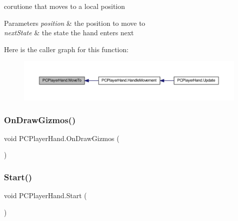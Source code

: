 corutione that moves to a local position 


\begin{DoxyParams}{Parameters}
{\em position} & the position to move to\\
\hline
{\em next\+State} & the state the hand enters next\\
\hline
\end{DoxyParams}
Here is the caller graph for this function\+:\nopagebreak
\begin{figure}[H]
\begin{center}
\leavevmode
\includegraphics[width=350pt]{class_p_c_player_hand_a338f6e5898a4953d48c046354ffef9e2_icgraph}
\end{center}
\end{figure}
\mbox{\label{class_p_c_player_hand_a40a567183ee039605d5778060e5ce17a}} 
\subsubsection{\texorpdfstring{On\+Draw\+Gizmos()}{OnDrawGizmos()}}
{\footnotesize\ttfamily void P\+C\+Player\+Hand.\+On\+Draw\+Gizmos (\begin{DoxyParamCaption}{ }\end{DoxyParamCaption})\hspace{0.3cm}{\ttfamily [private]}}

\mbox{\label{class_p_c_player_hand_aa3eed40e80c66f9e85905cf2c2c4fcbe}} 
\subsubsection{\texorpdfstring{Start()}{Start()}}
{\footnotesize\ttfamily void P\+C\+Player\+Hand.\+Start (\begin{DoxyParamCaption}{ }\end{DoxyParamCaption})\hspace{0.3cm}{\ttfamily [private]}}

